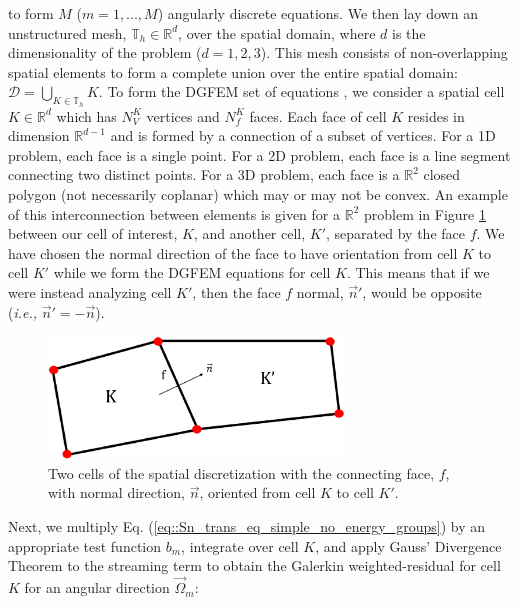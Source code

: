 \noindent to form $M$ ($m=1,...,M$) angularly discrete equations. We then lay down an unstructured mesh, $\mathbb{T}_h \in \mathbb{R}^{d}$, over the spatial domain, where $d$ is the dimensionality of the problem ($d=1,2,3$). This mesh consists of non-overlapping spatial elements to form a complete union over the entire spatial domain: $\mathcal{D} = \bigcup_{K \in \mathbb{T}_h} K$. To form the DGFEM set of equations \cite{ern2013theory,wareing2001discontinuous}, we consider a spatial cell $K \in \mathbb{R}^d$ which has $N_V^K$ vertices and $N_f^K$ faces. Each face of cell $K$ resides in dimension $\mathbb{R}^{d-1}$ and is formed by a connection of a subset of vertices. For a 1D problem, each face is a single point. For a 2D problem, each face is a line segment connecting two distinct points. For a 3D problem, each face is a $\mathbb{R}^2$ closed polygon (not necessarily coplanar) which may or may not be convex. An example of this interconnection between elements is given for a $\mathbb{R}^2$ problem in Figure \ref{fig::Sn_two_ref_cells} between our cell of interest, $K$, and another cell, $K'$, separated by the face $f$. We have chosen the normal direction of the face to have orientation from cell $K$ to cell $K'$ while we form the DGFEM equations for cell $K$. This means that if we were instead analyzing cell $K'$, then the face $f$ normal, $\vec{n}' $, would be opposite ({\em i.e.,} $\vec{n}' = -\vec{n}$).

\begin{figure}
\centering
\includegraphics[width=0.7\textwidth]{figures/sec_Sn/two_cells_Rev1.eps}
\caption{Two cells of the spatial discretization with the connecting face, $f$, with normal direction, $\vec{n}$, oriented from cell $K$ to cell $K'$.}
\label{fig::Sn_two_ref_cells}
\end{figure}

Next, we multiply Eq. (\ref{eq::Sn_trans_eq_simple_no_energy_groups}) by an appropriate test function $b_m$, integrate over cell $K$, and apply Gauss' Divergence Theorem to the streaming term to obtain the Galerkin weighted-residual for cell $K$ for an angular direction $\vec{\Omega}_m$:

